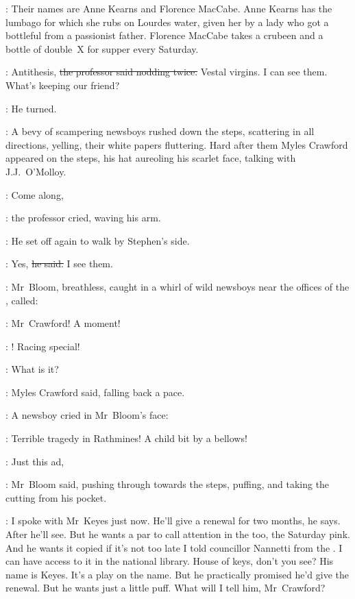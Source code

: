 \Stephen:
Their names are Anne Kearns and Florence MacCabe.
Anne Kearns has the lumbago for which she rubs on Lourdes water,
given her by a lady
who got a bottleful from a passionist father.
Florence MacCabe takes a crubeen and a bottle of double~X for supper every Saturday.

\machugh:
Antithesis,
\sout{the professor said nodding twice.}
Vestal virgins.
I can see them.
What's keeping our friend?

:
He turned.

:
A bevy of scampering newsboys rushed down the steps,
scattering in all directions, yelling,
their white papers fluttering.
Hard after them Myles Crawford appeared on the steps,
his hat aureoling his scarlet face,
talking with J.J.~O'Molloy.

\machugh:
Come along,

:
the professor cried,
waving his arm.

:
He set off again to walk by Stephen's side.



\machugh:
Yes,
\sout{he said.}
I see them.

:
Mr~Bloom,
breathless,
caught in a whirl of wild newsboys
near the offices of the ,
called:

\Bloom:
Mr~Crawford!
A moment!

\boy:
!
Racing special!

\crawford:
What is it?

:
Myles Crawford said,
falling back a pace.

:
A newsboy cried in Mr~Bloom's face:

\boy:
Terrible tragedy in Rathmines!
A child bit by a bellows!



\Bloom:
Just this ad,

:
Mr~Bloom said,
pushing through towards the steps,
puffing,
and taking the cutting from his pocket.

\Bloom:
I spoke with Mr~Keyes just now.
He'll give a renewal for two months, he says.
After he'll see.
But he wants a par to call attention in the  too,
the Saturday pink.
And he wants it copied if it's not too late
I told councillor Nannetti from the .
I can have access to it in the national library.
House of keys, don't you see?
His name is Keyes.
It's a play on the name.
But he practically promised he'd give the renewal.
But he wants
just a little puff.
What will I tell him, Mr~Crawford?


